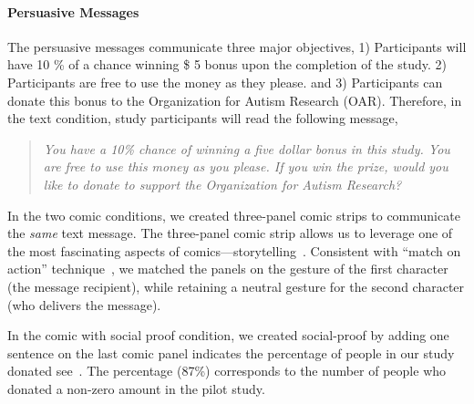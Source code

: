\paragraph{Persuasive Messages}
The persuasive messages communicate three major objectives, 1) Participants will have 10 \% of a chance winning \$ 5 bonus upon the completion of the study. 2) Participants are free to use the money as they please. and 3) Participants can donate this bonus to the Organization for Autism Research (OAR). Therefore, in the text condition, study participants will read the following message,
\begin{quote}
  \textit{You have a 10\% chance of winning a five dollar bonus in this study. You are free to use this money as you please. If you win the prize, would you like to donate to support the Organization for Autism Research?}
\end{quote}
In the two comic conditions, we created three-panel comic strips to communicate the \textit{same} text message. The three-panel comic strip allows us to leverage one of the most fascinating aspects of comics---storytelling~\cite{scott1993understanding}. 
Consistent with ``match on action'' technique~\cite{scott1993understanding}, we matched the panels on the gesture of the first character (the message recipient), while retaining a neutral gesture for the second character (who delivers the message). 



In the comic with social proof condition, we created social-proof by adding one sentence on the last comic panel indicates the percentage of people in our study donated see~. The percentage (87\%) corresponds to the number of people who donated a non-zero amount in the pilot study.

